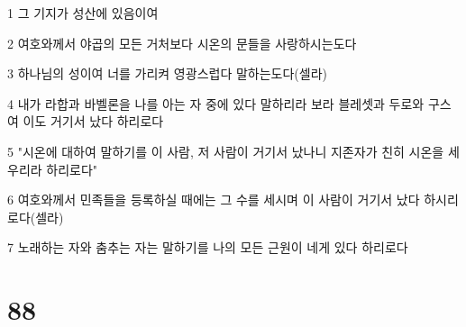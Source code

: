 \par 1 그 기지가 성산에 있음이여
\par 2 여호와께서 야곱의 모든 거처보다 시온의 문들을 사랑하시는도다
\par 3 하나님의 성이여 너를 가리켜 영광스럽다 말하는도다(셀라)
\par 4 내가 라합과 바벨론을 나를 아는 자 중에 있다 말하리라 보라 블레셋과 두로와 구스여 이도 거기서 났다 하리로다
\par 5 "시온에 대하여 말하기를 이 사람, 저 사람이 거기서 났나니 지존자가 친히 시온을 세우리라 하리로다"
\par 6 여호와께서 민족들을 등록하실 때에는 그 수를 세시며 이 사람이 거기서 났다 하시리로다(셀라)
\par 7 노래하는 자와 춤추는 자는 말하기를 나의 모든 근원이 네게 있다 하리로다

\chapter{88}

